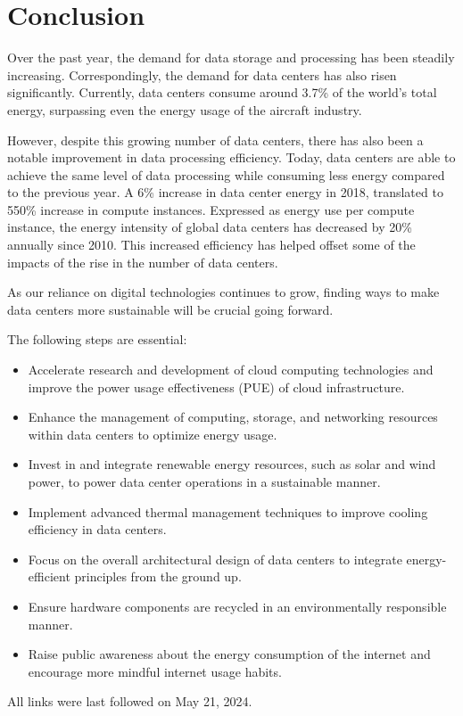 \documentclass[
  a4paper,  %
  twoside,  %
  bibliography=totoc,
  headsepline,
  cleardoublepage=empty,
  parskip=half,
  draft=false
]{scrbook}
\begin{document}



\chapter{Conclusion}
\label{chap:zusfas}
Over the past year, the demand for data storage and processing has been steadily increasing. Correspondingly, the demand for data centers has also risen significantly. Currently, data centers consume around 3.7\% of the world's total energy, surpassing even the energy usage of the aircraft industry.

However, despite this growing number of data centers, there has also been a notable improvement in data processing efficiency. Today, data centers are able to achieve the same level of data processing while consuming less energy compared to the previous year. A 6\% increase in data center energy in 2018, translated to 550\% increase in compute instances. Expressed as energy use per compute instance, the energy intensity of global data centers has decreased by 20\% annually since 2010\cite{doi:10.1126/science.aba3758}. This increased efficiency has helped offset some of the impacts of the rise in the number of data centers.

 As our reliance on digital technologies continues to grow, finding ways to make data centers more sustainable will be crucial going forward. 
 
The following steps are essential:
\begin{itemize}
	\item Accelerate research and development of cloud computing technologies and improve the power usage effectiveness (PUE) of cloud infrastructure.
	\item Enhance the management of computing, storage, and networking resources within data centers to optimize energy usage.
	\item Invest in and integrate renewable energy resources, such as solar and wind power, to power data center operations in a sustainable manner.
	\item Implement advanced thermal management techniques to improve cooling efficiency in data centers.
	\item Focus on the overall architectural design of data centers to integrate energy-efficient principles from the ground up.
	\item Ensure hardware components are recycled in an environmentally responsible manner.
	\item Raise public awareness about the energy consumption of the internet and encourage more mindful internet usage habits.
\end{itemize}


\printbibliography

All links were last followed on May 21, 2024.

%

\pagestyle{empty}
\renewcommand*{\chapterpagestyle}{empty}
\Versicherung
\end{document}
